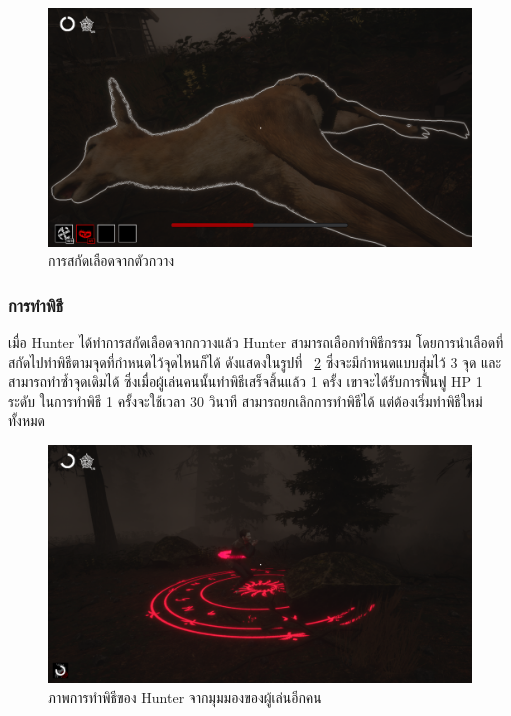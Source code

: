 \begin{figure}[p]
  \begin{center}
  \includegraphics[width=\textwidth]{./img/mechanics/extract_blood.png}
  \end{center}
  \caption[การสกัดเลือดจากตัวกวาง]{การสกัดเลือดจากตัวกวาง}
  \label{fig:blood}
\end{figure}

\subsubsection{การทำพิธี}

เมื่อ Hunter ได้ทำการสกัดเลือดจากกวางแล้ว Hunter สามารถเลือกทำพิธีกรรม โดยการนำเลือดที่สกัดไปทำพิธีตามจุดที่กำหนดไว้จุดไหนก็ได้ ดังแสดงในรูปที่ ~\ref{fig:ritual}
ซึ่งจะมีกำหนดแบบสุ่มไว้ 3 จุด และสามารถทำซ้ำจุดเดิมได้ ซึ่งเมื่อผู้เล่นคนนั้นทำพิธีเสร็จสิ้นแล้ว 1 ครั้ง เขาจะได้รับการฟื้นฟู 
HP 1 ระดับ ในการทำพิธี 1 ครั้งจะใช้เวลา 30 วินาที สามารถยกเลิกการทำพิธีได้ แต่ต้องเริ่มทำพิธีใหม่ทั้งหมด

\begin{figure}[h]
  \begin{center}
  \includegraphics[width=\textwidth]{./img/mechanics/ritual-complete.png}
  \end{center}
  \caption[ภาพการทำพิธีของ Hunter จากมุมมองของผู้เล่นอีกคน]{ภาพการทำพิธีของ Hunter จากมุมมองของผู้เล่นอีกคน}
  \label{fig:ritual}
\end{figure}

